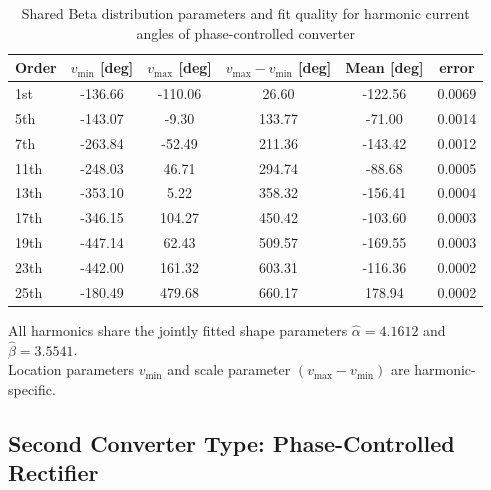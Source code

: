 \begin{table}[!b]
    \centering
    \caption{Shared Beta distribution parameters and fit quality for harmonic current angles of phase-controlled converter}
    \label{tab:beta_phase_params_pc}
    \scriptsize
    \setlength{\tabcolsep}{3pt}
    \begin{tabular}{l c c c c c}
    Order & $v_{\min}$ [deg] & $v_{\max}$ [deg] & $v_{\max}-v_{\min}$ [deg] & Mean [deg] & error \\
    \hline
    1st & -136.66 & -110.06 & 26.60 & -122.56 & 0.0069 \\
    5th & -143.07 & -9.30 & 133.77 & -71.00 & 0.0014 \\
    7th & -263.84 & -52.49 & 211.36 & -143.42 & 0.0012 \\
    11th & -248.03 & 46.71 & 294.74 & -88.68 & 0.0005 \\
    13th & -353.10 & 5.22 & 358.32 & -156.41 & 0.0004 \\
    17th & -346.15 & 104.27 & 450.42 & -103.60 & 0.0003 \\
    19th & -447.14 & 62.43 & 509.57 & -169.55 & 0.0003 \\
    23th & -442.00 & 161.32 & 603.31 & -116.36 & 0.0002 \\
    25th & -180.49 & 479.68 & 660.17 & 178.94 & 0.0002 \\
    \end{tabular}
    \vspace{2pt}
    \parbox{\columnwidth}{\scriptsize All harmonics share the jointly fitted shape parameters $\hat{\alpha}=4.1612$ and $\hat{\beta}=3.5541$. \\
    Location parameters $v_{\min}$ and scale parameter $(v_{\max} - v_{\min})$ are harmonic-specific.
    }
\end{table}

\subsection{Second Converter Type: Phase-Controlled Rectifier}
\label{sec:converter_types}

